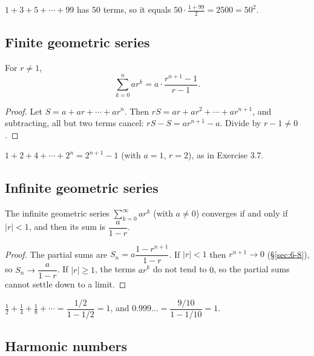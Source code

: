 \begin{example}
$1+3+5+\cdots+99$ has $50$ terms, so it equals $50\cdot\frac{1+99}{2}=2500=50^2$.
\end{example}

\subsection{Finite geometric series}
\label{sec:6-13}

\begin{theorem}
For $r\neq1$,
\[
\sum_{k=0}^n ar^k = a\cdot\frac{r^{n+1}-1}{r-1}.
\]
\end{theorem}
\begin{proof}
Let $S=a+ar+\cdots+ar^n$. Then $rS=ar+ar^2+\cdots+ar^{n+1}$, and subtracting, all but two terms cancel: $rS-S=ar^{n+1}-a$. Divide by $r-1\ne0$.
\end{proof}

\begin{example}
$1+2+4+\cdots+2^n=2^{n+1}-1$ (with $a=1$, $r=2$), as in Exercise 3.7.
\end{example}

\subsection{Infinite geometric series}
\label{sec:6-14}

\begin{theorem}
The infinite geometric series $\sum_{k=0}^\infty ar^k$ (with $a\ne0$) converges if and only if $|r|<1$, and then its sum is $\dfrac{a}{1-r}$.
\end{theorem}
\begin{proof}
The partial sums are $S_n = a\dfrac{1-r^{n+1}}{1-r}$. If $|r|<1$ then $r^{n+1}\to0$ (\S\ref{sec:6-8}), so $S_n \to \dfrac{a}{1-r}$. If $|r|\ge1$, the terms $ar^k$ do not tend to $0$, so the partial sums cannot settle down to a limit.
\end{proof}

\begin{example}
$\frac12+\frac14+\frac18+\cdots=\dfrac{1/2}{1-1/2}=1$, and $0.999\ldots=\dfrac{9/10}{1-1/10}=1$.
\end{example}

\subsection{Harmonic numbers}
\label{sec:6-15}

